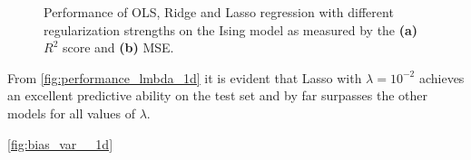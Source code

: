 \begin{figure}[H]
\centering
{}
\qquad
{}
\caption{Performance of OLS, Ridge and Lasso regression with different regularization strengths on the Ising model as measured by the \textbf{(a)} $R^2$ score and \textbf{(b)} MSE.}
\label{fig:performance_lmbda_1d}
\end{figure}

From \autoref{fig:performance_lmbda_1d} it is evident that Lasso with $\lambda=10^{-2}$ achieves an excellent predictive ability on the test set and by far surpasses the other models for all values of $\lambda$. 

\autoref{fig:bias_var__1d}

